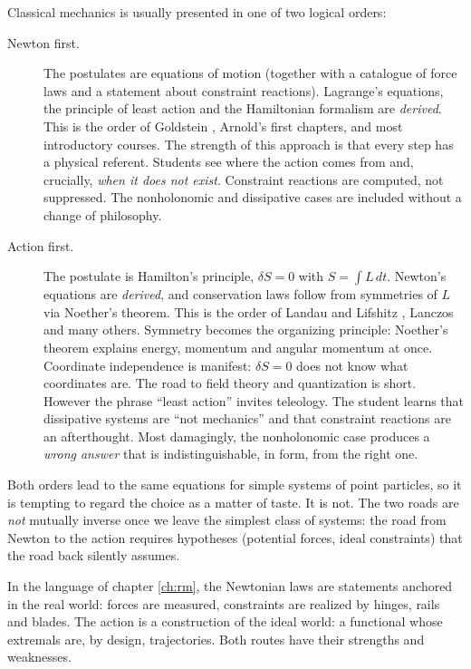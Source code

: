 Classical mechanics is usually presented in one of two logical orders:
\begin{description} 
    \item[Newton first.] The postulates are equations of motion (together with
        a catalogue of force laws and a statement about constraint reactions).
        Lagrange's equations, the principle of least action and the Hamiltonian
        formalism are \emph{derived}. This is the order of Goldstein
        \cite{GoldsteinPooleSafko2000}, Arnold's \cite{Arnold1989} first
        chapters, and most introductory courses. The strength of this approach
        is that    every step has a physical referent. Students see where the
        action comes from and, crucially, \emph{when it does not exist}.
        Constraint reactions are computed, not suppressed. The nonholonomic and
        dissipative cases are included without a change of philosophy. 
    \item[Action first.] The postulate is Hamilton's principle, $\delta S=0$ with
    $S=\int L\,dt$. Newton's equations are \emph{derived}, and conservation
        laws follow from symmetries of $L$ via Noether's theorem. This is the
        order of Landau and Lifshitz \cite{LandauLifshitz-1}, Lanczos
        \cite{Lanczos1970} and many others. Symmetry becomes the organizing
        principle: Noether's theorem explains energy, momentum and angular
        momentum at once. Coordinate independence is manifest: $\delta S=0$
        does not know what coordinates are. The road to field theory and
        quantization is short. However the phrase ``least action'' invites
        teleology. The student learns that dissipative systems are ``not
        mechanics'' and that constraint reactions are an afterthought. Most
        damagingly, the nonholonomic case produces a \emph{wrong answer} that
        is indistinguishable, in form, from the right one.
\end{description} 

Both orders lead to the same equations for simple systems of point particles,
so it is tempting to regard the choice as a matter of taste. It is not. The two
roads are \emph{not} mutually inverse once we leave the simplest class of
systems: the road from Newton to the action requires hypotheses (potential
forces, ideal constraints) that the road back silently assumes. 

In the language of chapter \ref{ch:rm}, the Newtonian laws are statements anchored
in the real world: forces are measured, constraints are realized by hinges,
rails and blades. The action is a construction of the ideal world: a functional
whose extremals are, by design, trajectories. Both routes have their strengths
and weaknesses.

